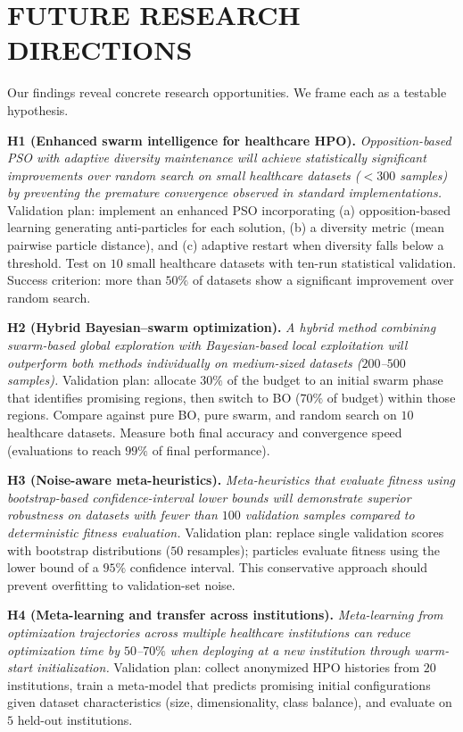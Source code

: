 \documentclass[letterpaper, 10 pt, conference]{ieeeconf}
\begin{document}
\section{FUTURE RESEARCH DIRECTIONS}
\label{sec:future}

Our findings reveal concrete research opportunities. We frame each as a testable hypothesis.

\textbf{H1 (Enhanced swarm intelligence for healthcare HPO).} \emph{Opposition-based PSO with adaptive diversity maintenance will achieve statistically significant improvements over random search on small healthcare datasets ($<300$ samples) by preventing the premature convergence observed in standard implementations.} Validation plan: implement an enhanced PSO incorporating (a) opposition-based learning generating anti-particles for each solution, (b) a diversity metric (mean pairwise particle distance), and (c) adaptive restart when diversity falls below a threshold. Test on $10$ small healthcare datasets with ten-run statistical validation. Success criterion: more than $50\%$ of datasets show a significant improvement over random search.

\textbf{H2 (Hybrid Bayesian--swarm optimization).} \emph{A hybrid method combining swarm-based global exploration with Bayesian-based local exploitation will outperform both methods individually on medium-sized datasets ($200$--$500$ samples).} Validation plan: allocate $30\%$ of the budget to an initial swarm phase that identifies promising regions, then switch to BO ($70\%$ of budget) within those regions. Compare against pure BO, pure swarm, and random search on $10$ healthcare datasets. Measure both final accuracy and convergence speed (evaluations to reach $99\%$ of final performance).

\textbf{H3 (Noise-aware meta-heuristics).} \emph{Meta-heuristics that evaluate fitness using bootstrap-based confidence-interval lower bounds will demonstrate superior robustness on datasets with fewer than $100$ validation samples compared to deterministic fitness evaluation.} Validation plan: replace single validation scores with bootstrap distributions ($50$ resamples); particles evaluate fitness using the lower bound of a $95\%$ confidence interval. This conservative approach should prevent overfitting to validation-set noise.

\textbf{H4 (Meta-learning and transfer across institutions).} \emph{Meta-learning from optimization trajectories across multiple healthcare institutions can reduce optimization time by $50$--$70\%$ when deploying at a new institution through warm-start initialization.} Validation plan: collect anonymized HPO histories from $20$ institutions, train a meta-model that predicts promising initial configurations given dataset characteristics (size, dimensionality, class balance), and evaluate on $5$ held-out institutions.
\end{document}
